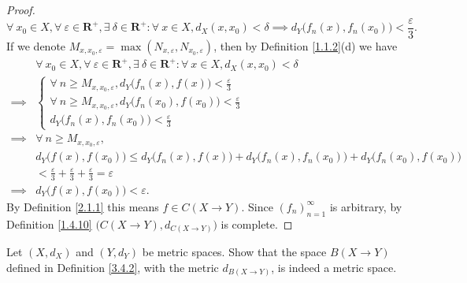 \begin{proof}
\[        \forall\ x_0 \in X, \forall\ \varepsilon \in \mathbf{R}^+, \exists\ \delta \in \mathbf{R}^+ : \forall\ x \in X, d_X(x, x_0) < \delta \implies d_Y\big(f_n(x), f_n(x_0)\big) < \frac{\varepsilon}{3}.
    \]
    If we denote \(M_{x, x_0, \varepsilon} = \max(N_{x, \varepsilon}, N_{x_0, \varepsilon})\), then by Definition \ref{1.1.2}(d) we have
    \begin{align*}
                 & \forall\ x_0 \in X, \forall\ \varepsilon \in \mathbf{R}^+, \exists\ \delta \in \mathbf{R}^+ : \forall\ x \in X, d_X(x, x_0) < \delta \\
        \implies & \begin{cases}
            \forall\ n \geq M_{x, x_0, \varepsilon}, d_Y\big(f_n(x), f(x)\big) < \frac{\varepsilon}{3}     \\
            \forall\ n \geq M_{x, x_0, \varepsilon}, d_Y\big(f_n(x_0), f(x_0)\big) < \frac{\varepsilon}{3} \\
            d_Y\big(f_n(x), f_n(x_0)\big) < \frac{\varepsilon}{3}
        \end{cases}                                                                                                           \\
        \implies & \forall\ n \geq M_{x, x_0, \varepsilon},                                                                                             \\
                 & d_Y\big(f(x), f(x_0)\big) \leq d_Y\big(f_n(x), f(x)\big) + d_Y\big(f_n(x), f_n(x_0)\big) + d_Y\big(f_n(x_0), f(x_0)\big)             \\
                 & < \frac{\varepsilon}{3} + \frac{\varepsilon}{3} + \frac{\varepsilon}{3} = \varepsilon                                                \\
        \implies & d_Y\big(f(x), f(x_0)\big) < \varepsilon.
    \end{align*}
    By Definition \ref{2.1.1} this means \(f \in C(X \to Y)\).
    Since \((f_n)_{n = 1}^\infty\) is arbitrary, by Definition \ref{1.4.10} \(\big(C(X \to Y), d_{C(X \to Y)}\big)\) is complete.
\end{proof}

\exercisesection

\begin{exercise}\label{ex 3.4.1}
    Let \((X, d_X)\) and \((Y, d_Y)\) be metric spaces.
    Show that the space \(B(X \to Y)\) defined in Definition \ref{3.4.2}, with the metric \(d_{B(X \to Y)}\), is indeed a metric space.
\end{exercise}

